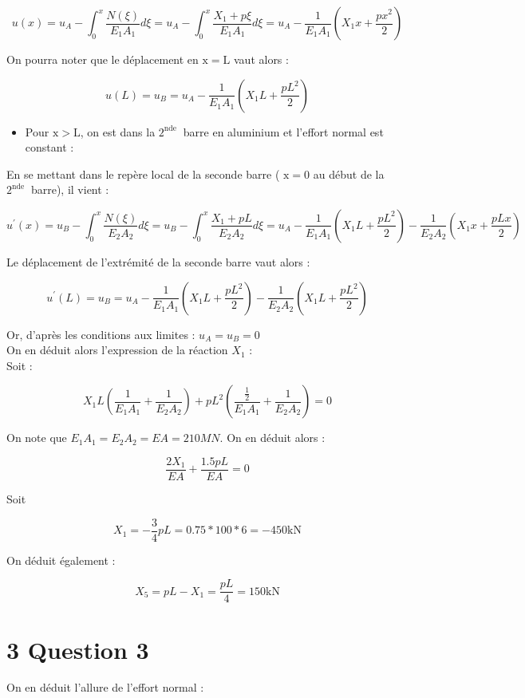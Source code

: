 \documentclass[11pt,a4paper]{report}
\begin{document}
{$$
u(x)=u_{A}-\int_{0}^{x} \frac{N(\xi)}{E_{1} A_{1}} d \xi=u_{A}-\int_{0}^{x} \frac{X_{1}+p \xi}{E_{1} A_{1}} d \xi=u_{A}-\frac{1}{E_{1} A_{1}}\left(X_{1} x+\frac{p x^{2}}{2}\right)
$$

On pourra noter que le déplacement en $\mathrm{x}=\mathrm{L}$ vaut alors :

$$
u(L)=u_{B}=u_{A}-\frac{1}{E_{1} A_{1}}\left(X_{1} L+\frac{p L^{2}}{2}\right)
$$

\begin{itemize}
  \item Pour $\mathrm{x}>\mathrm{L}$, on est dans la $2^{\text {nde }}$ barre en aluminium et l'effort normal est constant :
\end{itemize}

En se mettant dans le repère local de la seconde barre ( $\mathrm{x}=0$ au début de la $2^{\text {nde }}$ barre), il vient :

$$
u^{\prime}(x)=u_{B}-\int_{0}^{x} \frac{N(\xi)}{E_{2} A_{2}} d \xi=u_{B}-\int_{0}^{x} \frac{X_{1}+p L}{E_{2} A_{2}} d \xi=u_{A}-\frac{1}{E_{1} A_{1}}\left(X_{1} L+\frac{p L^{2}}{2}\right)-\frac{1}{E_{2} A_{2}}\left(X_{1} x+\frac{p L x}{2}\right)
$$

Le déplacement de l'extrémité de la seconde barre vaut alors :

$$
u^{\prime}(L)=u_{B}=u_{A}-\frac{1}{E_{1} A_{1}}\left(X_{1} L+\frac{p L^{2}}{2}\right)-\frac{1}{E_{2} A_{2}}\left(X_{1} L+\frac{p L^{2}}{2}\right)
$$

Or, d'après les conditions aux limites : $u_{A}=u_{B}=0$\\
On en déduit alors l'expression de la réaction $X_{1}$ :\\
Soit :

$$
X_{1} L\left(\frac{1}{E_{1} A_{1}}+\frac{1}{E_{2} A_{2}}\right)+p L^{2}\left(\frac{\frac{1}{2}}{E_{1} A_{1}}+\frac{1}{E_{2} A_{2}}\right)=0
$$

On note que $E_{1} A_{1}=E_{2} A_{2}=E A=210 M N$. On en déduit alors :

$$
\frac{2 X_{1}}{E A}+\frac{1.5 p L}{E A}=0
$$

Soit

$$
X_{1}=-\frac{3}{4} p L=0.75 * 100 * 6=-450 \mathrm{kN}
$$

On déduit également :

$$
X_{5}=p L-X_{1}=\frac{p L}{4}=150 \mathrm{kN}
$$

\section*{3 Question 3}
On en déduit l'allure de l'effort normal :

}
\end{document}
